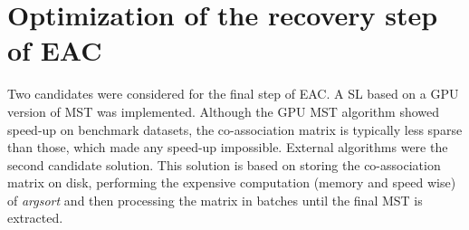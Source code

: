 
\section{Optimization of the recovery step of EAC}
\label{sec:recovery}


Two candidates were considered for the final step of EAC.
A SL based on a GPU version of MST \cite{Sousa2015} was implemented.
Although the GPU MST algorithm showed speed-up on benchmark datasets, the co-association matrix is typically less sparse than those, which made any speed-up impossible.
External algorithms were the second candidate solution.
This solution is based on storing the co-association matrix on disk, performing the expensive computation (memory and speed wise) of \emph{argsort} and then processing the matrix in batches until the final MST is extracted.



